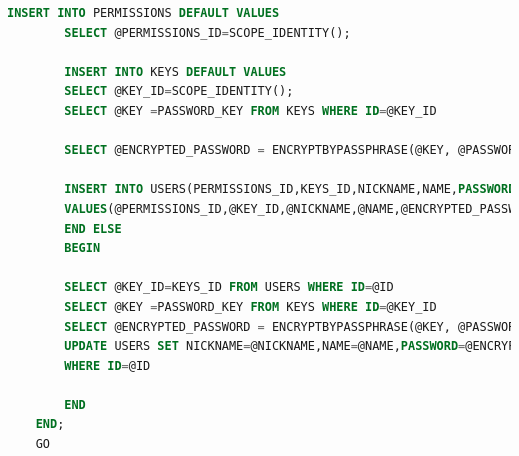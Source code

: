 \documentclass[a4paper,DIV=12]{scrreprt}
\begin{document}
\begin{lstlisting}[language={SQL}]
        INSERT INTO PERMISSIONS DEFAULT VALUES
        SELECT @PERMISSIONS_ID=SCOPE_IDENTITY();
    
        INSERT INTO KEYS DEFAULT VALUES
        SELECT @KEY_ID=SCOPE_IDENTITY();
        SELECT @KEY =PASSWORD_KEY FROM KEYS WHERE ID=@KEY_ID
    
        SELECT @ENCRYPTED_PASSWORD = ENCRYPTBYPASSPHRASE(@KEY, @PASSWORD);
            
        INSERT INTO USERS(PERMISSIONS_ID,KEYS_ID,NICKNAME,NAME,PASSWORD,PICTURE,ENABLED)
        VALUES(@PERMISSIONS_ID,@KEY_ID,@NICKNAME,@NAME,@ENCRYPTED_PASSWORD,@PICTURE,@ENABLED)
        END ELSE
        BEGIN
    
        SELECT @KEY_ID=KEYS_ID FROM USERS WHERE ID=@ID
        SELECT @KEY =PASSWORD_KEY FROM KEYS WHERE ID=@KEY_ID
        SELECT @ENCRYPTED_PASSWORD = ENCRYPTBYPASSPHRASE(@KEY, @PASSWORD);
        UPDATE USERS SET NICKNAME=@NICKNAME,NAME=@NAME,PASSWORD=@ENCRYPTED_PASSWORD,PICTURE=@PICTURE,ENABLED=@ENABLED
        WHERE ID=@ID
    
        END
    END;
    GO
    

\end{lstlisting}
\end{document}
